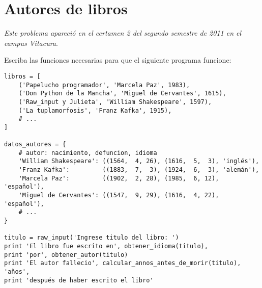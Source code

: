 \section{Autores de libros}

\emph{Este problema apareció en el certamen 2 del segundo semestre de
2011 en el campus Vitacura}.

Escriba las funciones necesarias para que el siguiente programa
funcione:

\begin{lstlisting}
libros = [
    ('Papelucho programador', 'Marcela Paz', 1983),
    ('Don Python de la Mancha', 'Miguel de Cervantes', 1615),
    ('Raw_input y Julieta', 'William Shakespeare', 1597),
    ('La tuplamorfosis', 'Franz Kafka', 1915),
    # ...
]

datos_autores = {
    # autor: nacimiento, defuncion, idioma
    'William Shakespeare': ((1564,  4, 26), (1616,  5,  3), 'inglés'),
    'Franz Kafka':         ((1883,  7,  3), (1924,  6,  3), 'alemán'),
    'Marcela Paz':         ((1902,  2, 28), (1985,  6, 12), 'español'),
    'Miguel de Cervantes': ((1547,  9, 29), (1616,  4, 22), 'español'),
    # ...
}

titulo = raw_input('Ingrese titulo del libro: ')
print 'El libro fue escrito en', obtener_idioma(titulo),
print 'por', obtener_autor(titulo)
print 'El autor fallecio', calcular_annos_antes_de_morir(titulo), 'años',
print 'después de haber escrito el libro'
\end{lstlisting}

